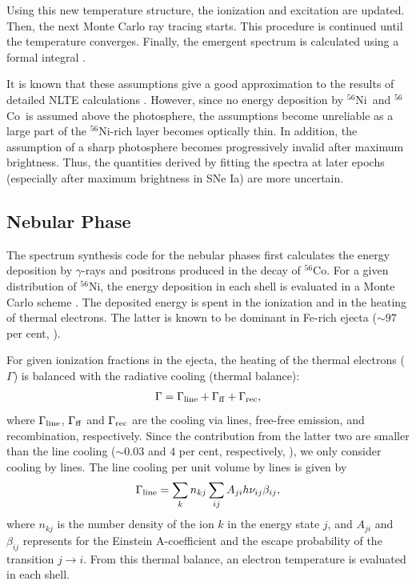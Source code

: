 \documentclass[usegraphicx,usenatbib]{mn2e}
\newcommand{\Cofs}{$^{56}$Co}
\newcommand{\Nifs}{$^{56}$Ni}
\begin{document}
Using this new temperature structure, the ionization and excitation are updated.
Then, the next Monte Carlo ray tracing starts. This procedure is continued until
the temperature converges. Finally, the emergent spectrum is calculated using a 
formal integral \citep{lucy99}.

It is known that these assumptions give a good approximation to the results of
detailed NLTE calculations \citep{pauldrach96}. However, since no energy
deposition by \Nifs\ and \Cofs\ is assumed  above the photosphere, the
assumptions become unreliable as a large part of the \Nifs-rich layer becomes
optically thin. In addition, the assumption of a sharp photosphere becomes
progressively invalid after maximum brightness. Thus, the quantities derived by
fitting the spectra at later epochs (especially after maximum brightness in
SNe Ia) are more uncertain.


\subsection{Nebular Phase}
\label{app:late}

The spectrum synthesis code for the nebular phases first calculates the energy
deposition by $\gamma$-rays and positrons produced in the decay of \Cofs. For a
given distribution of \Nifs, the energy deposition in each shell is evaluated in
a Monte Carlo scheme \citep{cappellaro97}. The deposited energy is spent in the
ionization and in the heating of thermal electrons. The latter is known to be
dominant in Fe-rich ejecta ($\sim 97$ per cent, \citealt{axelrod80}).

For given ionization fractions in the ejecta, the heating of the thermal
electrons ($\Gamma$)  is balanced with the radiative cooling (thermal balance):
\begin{equation}
\Gamma = \Gamma_{\rm line} + \Gamma_{\rm ff} + \Gamma_{\rm rec},
\end{equation}
where $\Gamma_{\rm line}$, $\Gamma_{\rm ff}$ and $\Gamma_{\rm rec}$ are the
cooling via lines, free-free emission, and recombination, respectively. Since 
the contribution from the latter two are smaller than the line cooling 
($\sim 0.03$ and $4$ per cent, respectively, 
\citealt{ruizlapuente92}), we only consider cooling by lines. The line cooling 
per unit volume by lines is given by
\begin{equation}
\Gamma_{\rm line} = \sum\limits_{k} n_{kj}
\sum\limits_{ij} A_{ji}h\nu_{ij}\beta_{ij},
\end{equation}
where $n_{kj}$ is the number density of the ion $k$ in the energy state $j$, 
and $A_{ji}$ and $\beta_{ij}$ represents for the Einstein A-coefficient and the
escape probability of the transition $j \rightarrow i$. From this thermal
balance, an electron temperature is evaluated in each shell.
\end{document}
